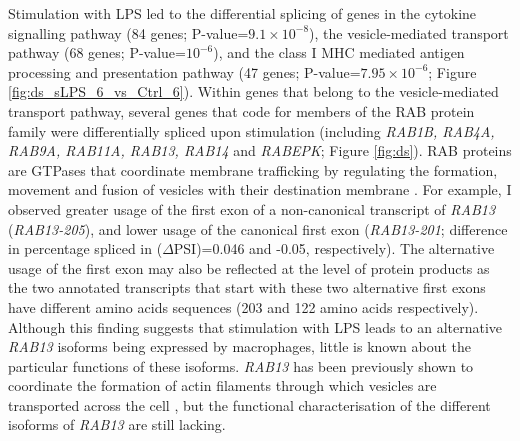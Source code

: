 Stimulation with LPS led to the differential splicing of genes in the cytokine signalling pathway (84 genes; P-value=$9.1\times10^{-8}$), the vesicle-mediated transport pathway (68 genes; P-value=$10^{-6}$), and the class I MHC mediated antigen processing and presentation pathway (47 genes; P-value=$7.95\times10^{-6}$; Figure \ref{fig:ds_sLPS_6_vs_Ctrl_6}). Within genes that belong to the vesicle-mediated transport pathway, several genes that code for members of the RAB protein family were differentially spliced upon stimulation (including \textit{RAB1B, RAB4A, RAB9A, RAB11A, RAB13, RAB14} and \textit{RABEPK}; Figure \ref{fig:ds}). RAB proteins are GTPases that coordinate membrane trafficking by regulating the formation, movement and fusion of vesicles with their destination membrane \cite{Stenmark2009-ju}. For example, I observed greater usage of the first exon of a non-canonical transcript of \textit{RAB13} (\textit{RAB13-205}), and lower usage of the canonical first exon (\textit{RAB13-201}; difference in percentage spliced in ($\Delta$PSI)=0.046 and -0.05, respectively). The alternative usage of the first exon may also be reflected at the level of protein products as the two annotated transcripts that start with these two alternative first exons have different amino acids sequences (203 and 122 amino acids respectively). Although this finding suggests that stimulation with LPS leads to an alternative \textit{RAB13} isoforms being expressed by macrophages, little is known about the particular functions of these isoforms. \textit{RAB13} has been previously shown to coordinate the formation of actin filaments through which vesicles are transported across the cell \cite{Sakane2012-km}, but the functional characterisation of the different isoforms of \textit{RAB13} are still lacking.\\

